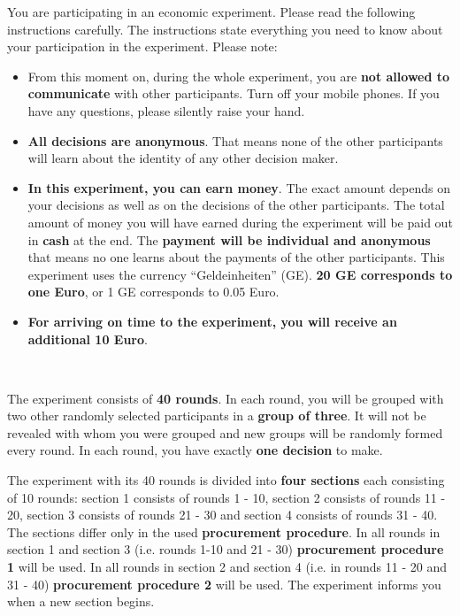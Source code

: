 \documentclass[11pt]{scrartcl}
\begin{document}
	


You are participating in an economic experiment. Please read the following instructions carefully. The instructions state everything you need to know about your participation in the experiment. \bigbreak
Please note:
\begin{itemize}
	\item From this moment on, during the whole experiment, you are \textbf{not allowed to communicate} with other participants. Turn off your mobile phones. If you have any questions, please silently raise your hand.
	\item \textbf{All decisions are anonymous}. That means none of the other participants will learn about the identity of any other decision maker.
	\item \textbf{In this experiment, you can earn money}. The exact amount depends on your decisions as well as on the decisions of the other participants. The total amount of money you will have earned during the experiment will be paid out in \textbf{cash} at the end. The \textbf{payment will be individual and anonymous} that means no one learns about the payments of the other participants. This experiment uses the currency \enquote{Geldeinheiten} (GE). \textbf{20 GE corresponds to one Euro}, or 1 GE corresponds to 0.05 Euro.
	\item \textbf{For arriving on time to the experiment, you will receive an additional 10 Euro}.
\end{itemize}

~\par
		

The experiment consists of \textbf{40 rounds}. In each round, you will be grouped with two other randomly selected participants in a \textbf{group of three}. It will not be revealed with whom you were grouped and new groups will be randomly formed every round. In each round, you have exactly \textbf{one decision} to make.



The experiment with its 40 rounds is divided into \textbf{four sections} each consisting of 10 rounds: section 1 consists of rounds 1 - 10, section 2 consists of rounds 11 - 20, section 3 consists of rounds 21 - 30 and section 4 consists of rounds 31 - 40. ~\bigbreak
The sections differ only in the used \textbf{procurement procedure}. In all rounds in section 1 and section 3 (i.e. rounds 1-10 and 21 - 30) \textbf{procurement procedure 1} will be used. In all rounds in section 2 and section 4 (i.e. in rounds 11 - 20 and 31 - 40) \textbf{procurement procedure 2} will be used. The experiment informs you when a new section begins.
\end{document}
